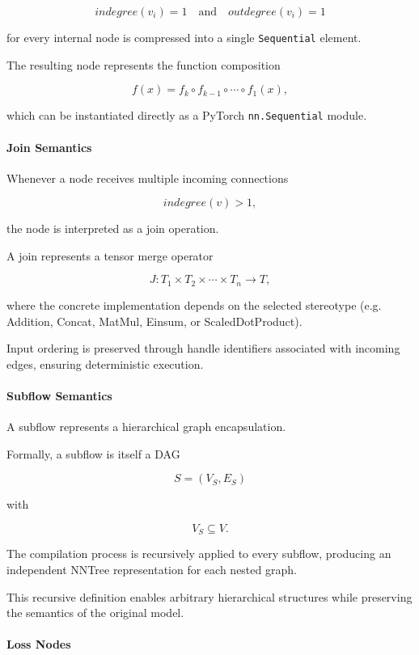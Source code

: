 \documentclass[11pt,a4paper]{article}
\begin{document}
\[
	indegree(v_i)=1
	\quad\text{and}\quad
	outdegree(v_i)=1
\]

for every internal node is compressed into a single \texttt{Sequential} element.

The resulting node represents the function composition

\[
	f(x)
	=
	f_k
	\circ
	f_{k-1}
	\circ
	\cdots
	\circ
	f_1(x),
\]

which can be instantiated directly as a PyTorch \texttt{nn.Sequential} module.

\paragraph{Join Semantics}

Whenever a node receives multiple incoming connections

\[
	indegree(v) > 1,
\]

the node is interpreted as a join operation.

A join represents a tensor merge operator

\[
	J :
	T_1 \times T_2 \times \cdots \times T_n
	\rightarrow T,
\]

where the concrete implementation depends on the selected stereotype (e.g. Addition,
Concat, MatMul, Einsum, or ScaledDotProduct).

Input ordering is preserved through handle identifiers associated with incoming edges,
ensuring deterministic execution.

\paragraph{Subflow Semantics}

A subflow represents a hierarchical graph encapsulation.

Formally, a subflow is itself a DAG

\[
	S=(V_S,E_S)
\]

with

\[
	V_S \subseteq V.
\]

The compilation process is recursively applied to every subflow, producing an independent
NNTree representation for each nested graph.

This recursive definition enables arbitrary hierarchical structures while preserving the
semantics of the original model.

\paragraph{Loss Nodes}
\end{document}
